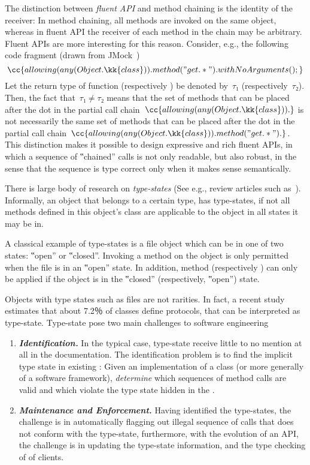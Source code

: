 The distinction between \emph{fluent API} and method chaining is the identity of the receiver:
In method chaining, all methods are invoked on the same object, whereas in fluent API
the receiver of each method in the chain may be arbitrary.
Fluent APIs are more interesting for this reason.
Consider, e.g., the following \Java code fragment (drawn from JMock~\cite{Freeman:Pryce:06})
\[
  \cc{allowing(any(Object.\kk{class})).method("get.*").withNoArguments();}
\]
Let the return type of function  (respectively ) be denoted by~$τ₁$
(respectively~$τ₂$).
Then, the fact that~$τ₁≠τ₂$ means that the set of methods that can be placed after the dot
in the partial call chain~$\cc{allowing(any(Object.\kk{class})).}$
is not necessarily the same set of methods that can be placed after the 
dot in the partial call chain~$\cc{allowing(any(Object.\kk{class})).method("get.*").}$.
This distinction makes it possible to design expressive and rich fluent APIs, in which a
sequence of ‟chained” calls is not only readable, but also robust, in the sense that the
sequence is type correct only when it makes sense semantically.

There is large body of research on \emph{type-states} 
(See e.g., review articles such
  as~\cite{Aldrich:Sunshine:2009,Bierhoff:Aldrich:2005}).
Informally, an object that belongs to a certain type, has
type-states, if not all methods defined in this object's class are applicable
to the object in all states it may be in.

A classical example of type-states is a file object which can be in one of two
states: ‟open” or ‟closed”. Invoking a  method on the object is only
permitted when the file is in an ‟open” state. In addition, method 
(respectively ) can only be applied if the object is in the
‟closed” (respectively, ‟open”) state.

Objects with type states such as files are not rarities.
In fact, a recent study~\cite{Beckman:2011} estimates
  that about 7.2％ of \Java classes define protocols, that can be interpreted as type-state.
Type-state pose two main challenges to software engineering
\begin{enumerate}
  \item \emph{\textbf{Identification.}}
    In the typical case, type-state
        receive little to no mention at all in the documentation.
    The identification problem is to find the implicit
    type state in existing \Java: Given an implementation of a class
    (or more generally of a software framework),
    \emph{determine} which sequences of method calls are valid and which violate the
    type state hidden in the \Java.
  \item \emph{\textbf{Maintenance and Enforcement.}}
    Having identified the type-states, the challenge is in automatically flagging out
      illegal sequence of calls that does not conform
      with the type-state, furthermore, with the
      evolution of an API, the challenge is in updating the type-state information,
      and the type checking of \Java of clients.
\end{enumerate}

